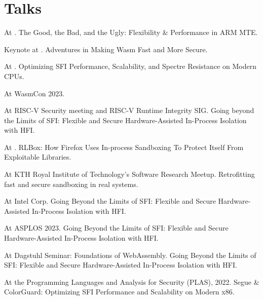 \section{Talks}

{ At . The Good, the Bad, and the Ugly: Flexibility \& Performance in ARM MTE.}

{ Keynote at . Adventures in Making Wasm Fast and More Secure.}

{ At . Optimizing SFI Performance, Scalability, and Spectre
Resistance on Modern CPUs.}

{ At WasmCon 2023. }

{ At RISC-V Security meeting and RISC-V Runtime Integrity SIG. Going beyond the
Limits of SFI: Flexible and Secure Hardware-Assisted In-Process Isolation with
HFI. }

{ At . RLBox: How Firefox Uses
In-process Sandboxing To Protect Itself From Exploitable Libraries. }

{ At KTH Royal Institute of Technology's Software Research Meetup.
Retrofitting fast and secure sandboxing in real systems.
}

{ At Intel Corp. Going Beyond the Limits of SFI: Flexible and Secure
Hardware-Assisted In-Process Isolation with HFI. }

{ At ASPLOS 2023. Going Beyond the Limits of SFI: Flexible and Secure
Hardware-Assisted In-Process Isolation with HFI. }

{ At Dagstuhl Seminar:
{Foundations of WebAssembly}. Going Beyond the Limits of SFI: Flexible and
Secure Hardware-Assisted In-Process Isolation with HFI. }

{ At the Programming Languages and Analysis for Security (PLAS), 2022. Segue \&
ColorGuard: Optimizing SFI Performance and Scalability on Modern x86. }

